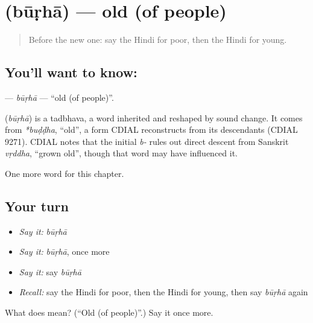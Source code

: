 \section[\texorpdfstring{\hi{बूढ़ा} (būṛhā)}{बूढ़ा (būṛhā)}]{ (būṛhā) — old (of people)}

\label{lesson:HI-C157-burha}



\begin{quote}
Before the new one: say the Hindi for poor, then the Hindi for young.
\end{quote}

\subsection*{You'll want to know: }
\textbf{} — \emph{būṛhā} — \textquotedblleft{}old (of people)\textquotedblright{}.

\begin{cousinweb}
\textbf{} (\emph{būṛhā}) is a tadbhava, a word inherited and reshaped by sound change. It comes from \emph{*buḍḍha}, \textquotedblleft{}old\textquotedblright{}, a form CDIAL reconstructs from its descendants (CDIAL 9271). CDIAL notes that the initial \emph{b-} rules out direct descent from Sanskrit \emph{vṛddha}, \textquotedblleft{}grown old\textquotedblright{}, though that word may have influenced it.
\end{cousinweb}

\begin{grammarlens}[title={What you've built}]
One more word for this chapter.
\end{grammarlens}

\subsection*{Your turn}
\begin{itemize}
\raggedright
  \item \emph{Say it:} \emph{būṛhā}
  \item \emph{Say it:} \emph{būṛhā}, once more
  \item \emph{Say it:} say \emph{būṛhā}
  \item \emph{Recall:} say the Hindi for poor, then the Hindi for young, then say \emph{būṛhā} again
\end{itemize}

\begin{tcolorbox}[breakable,colback=teal!4,colframe=teal!35!black,title={Before you move on}]
What does  mean? (\textquotedblleft{}Old (of people)\textquotedblright{}.) Say it once more.
\end{tcolorbox}
